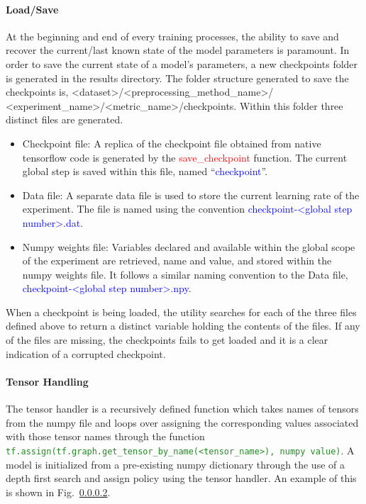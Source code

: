 \documentclass{llncs}
\begin{document}
\paragraph{Load/Save}
At the beginning and end of every training processes, the ability to save and recover the current/last known state of the model parameters is paramount.
In order to save the current state of a model's parameters, a new checkpoints folder is generated in the results directory.
The folder structure generated to save the checkpoints is, \textless dataset\textgreater/\textless preprocessing\_method\_name\textgreater/\\\textless experiment\_name\textgreater/\textless metric\_name\textgreater/checkpoints.
Within this folder three distinct files are generated.
\begin{itemize}
\item Checkpoint file: A replica of the checkpoint file obtained from native tensorflow code is generated by the \textcolor{red}{save\_checkpoint} function.
The current global step is saved within this file, named ``\textcolor{blue}{checkpoint}''.
\item Data file: A separate data file is used to store the current learning rate of the experiment.
The file is named using the convention \textcolor{blue}{checkpoint-\textless global step number\textgreater .dat}.
\item Numpy weights file: Variables declared and available within the global scope of the experiment are retrieved, name and value, and stored within the numpy weights file.
It follows a similar naming convention to the Data file, \textcolor{blue}{checkpoint-\textless global step number\textgreater .npy}.
\end{itemize}

When a checkpoint is being loaded, the utility searches for each of the three files defined above to return a distinct variable holding the contents of the files.
If any of the files are missing, the checkpoints fails to get loaded and it is a clear indication of a corrupted checkpoint.

\paragraph{Tensor Handling}
The tensor handler is a recursively defined function which takes names of tensors from the numpy file and loops over assigning the corresponding values associated with those tensor names through the function \texttt{\textcolor{ForestGreen}{tf.assign(tf.graph.get\_tensor\_by\_name(\textless tensor\_name\textgreater), numpy value)}}.
A model is initialized from a pre-existing numpy dictionary through the use of a depth first search and assign policy using the tensor handler.
An example of this is shown in Fig.~\ref{}.
\end{document}
